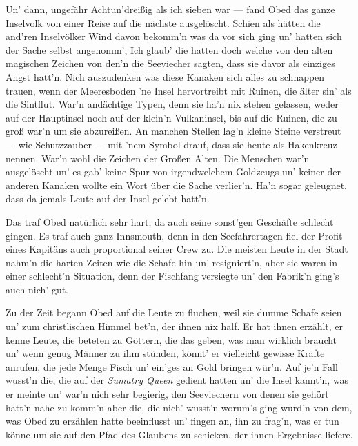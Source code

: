 Un' dann, ungefähr Achtun'dreißig als ich sieben war --- fand Obed das ganze Inselvolk von einer Reise auf die nächste ausgelöscht. Schien als hätten die and'ren Inselvölker Wind davon bekomm'n was da vor sich ging un' hatten sich der Sache selbst angenomm', Ich glaub' die hatten doch welche von den alten magischen Zeichen von den'n die Seeviecher sagten, dass sie davor als einziges Angst hatt'n. Nich auszudenken was diese Kanaken sich alles zu schnappen trauen, wenn der Meeresboden 'ne Insel hervortreibt mit Ruinen, die älter sin' als die Sintflut. War'n andächtige Typen, denn sie ha'n nix stehen gelassen, weder auf der Hauptinsel noch auf der klein'n Vulkaninsel, bis auf die Ruinen, die zu groß war'n um sie abzureißen. An manchen Stellen lag'n kleine Steine verstreut --- wie Schutzzauber --- mit 'nem Symbol drauf, dass sie heute als Hakenkreuz nennen. War'n wohl die Zeichen der Großen Alten. Die Menschen war'n ausgelöscht un' es gab' keine Spur von irgendwelchem Goldzeugs un' keiner der anderen Kanaken wollte ein Wort über die Sache verlier'n. Ha'n sogar geleugnet, dass da jemals Leute auf der Insel gelebt hatt'n.

Das traf Obed natürlich sehr hart, da auch seine sonst'gen Geschäfte schlecht gingen. Es traf auch ganz Innsmouth, denn in den Seefahrertagen fiel der Profit eines Kapitäns auch proportional seiner Crew zu. Die meisten Leute in der Stadt nahm'n die harten Zeiten wie die Schafe hin un' resigniert'n, aber sie waren in einer schlecht'n Situation, denn der Fischfang versiegte un' den Fabrik'n ging's auch nich' gut.

Zu der Zeit begann Obed auf die Leute zu fluchen, weil sie dumme Schafe seien un' zum christlischen Himmel bet'n, der ihnen nix half. Er hat ihnen erzählt, er kenne Leute, die beteten zu Göttern, die das geben, was man wirklich braucht un' wenn genug Männer zu ihm stünden, könnt' er vielleicht gewisse Kräfte anrufen, die jede Menge Fisch un' ein'ges an Gold bringen wür'n. Auf je'n Fall wusst'n die, die auf der \textit{Sumatry Queen} gedient hatten un' die Insel kannt'n, was er meinte un' war'n nich sehr begierig, den Seeviechern von denen sie gehört hatt'n nahe zu komm'n aber die, die nich' wusst'n worum's ging wurd'n von dem, was Obed zu erzählen hatte beeinflusst un' fingen an, ihn zu frag'n, was er tun könne um sie auf den Pfad des Glaubens zu schicken, der ihnen Ergebnisse liefere.\grqq


